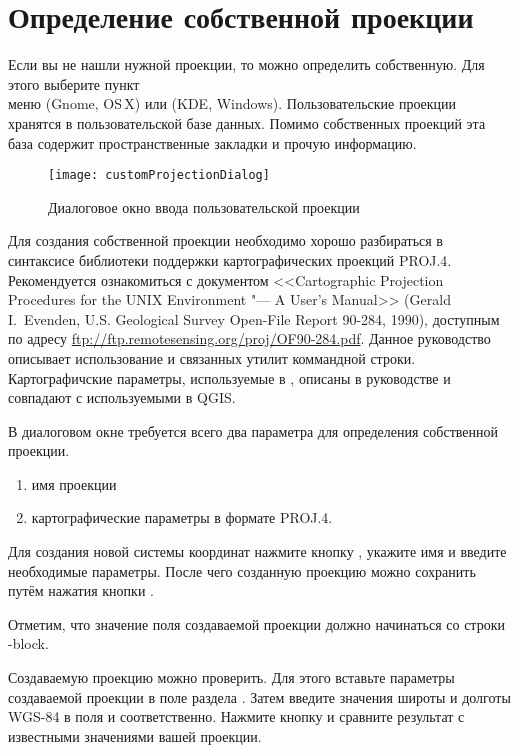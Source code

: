 \section{Определение собственной проекции}\label{sec:customprojections}

Если вы не нашли нужной проекции, то можно определить собственную. Для этого
выберите пункт \\
 меню
 (Gnome, OS\,X) или  (KDE,
Windows). Пользовательские проекции хранятся в пользовательской базе
данных. Помимо собственных проекций эта база содержит пространственные
закладки и прочую информацию.

\begin{figure}[ht]
   \centering
   \texttt{[image: customProjectionDialog]}
   \caption{Диалоговое окно ввода пользовательской проекции
   \wincaption}\label{fig:customprojections}
\end{figure}

Для создания собственной проекции необходимо хорошо разбираться в синтаксисе
библиотеки поддержки картографических проекций PROJ.4. Рекомендуется
ознакомиться с документом <<Cartographic Projection Procedures for
the UNIX Environment "--- A User's Manual>> (Gerald I.~Evenden, U.S.
Geological Survey Open-File Report 90-284, 1990), доступным по адресу
\url{ftp://ftp.remotesensing.org/proj/OF90-284.pdf}.
Данное руководство описывает использование  и связанных
утилит коммандной строки. Картографичские параметры, используемые в
, описаны в руководстве и совпадают с используемыми в QGIS.

В диалоговом окне 
требуется всего два параметра для определения собственной проекции.
\begin{enumerate}
\item имя проекции
\item картографические параметры в формате PROJ.4.
\end{enumerate}
Для создания новой системы координат нажмите кнопку
, укажите имя и введите необходимые параметры. После
чего созданную проекцию можно сохранить путём нажатия кнопки
.

Отметим, что значение поля  создаваемой проекции должно
начинаться со строки -block.

Создаваемую проекцию можно проверить.
Для этого вставьте параметры создаваемой проекции в поле
 раздела . Затем введите значения
широты и долготы WGS-84 в поля  и 
соответственно. Нажмите кнопку  и сравните результат
с известными значениями вашей проекции.

\FloatBarrier
